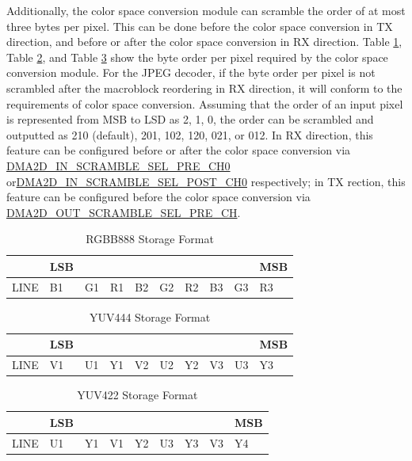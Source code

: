 \documentclass[main\_\_EN.tex]{subfiles}
\begin{document}
Additionally, the color space conversion module can scramble the order of at most three bytes per pixel. This can be done before the color space conversion in TX direction, and before or after the color space conversion in RX direction. Table \ref{tab:rgb888_order}, Table \ref{tab:yuv444_order}, and Table \ref{tab:yuv422_order} show the byte order per pixel required by the color space conversion module. For the JPEG decoder, if the byte order per pixel is not scrambled after the macroblock reordering in RX direction, it will conform to the requirements of color space conversion. Assuming that the order of an input pixel is represented from MSB to LSD as 2, 1, 0, the order can be scrambled and outputted as 210 (default), 201, 102, 120, 021, or 012. In RX direction, this feature can be configured before or after the color space conversion via \hyperref[fielddesc:DMA2DINSCRAMBLESELPRECH0]{DMA2D\_IN\_SCRAMBLE\_SEL\_PRE\_CH0} or\hyperref[fielddesc:DMA2DINSCRAMBLESELPOSTCH0]{DMA2D\_IN\_SCRAMBLE\_SEL\_POST\_CH0} respectively; in TX rection, this feature can be configured before the color space conversion via \hyperref[fielddesc:DMA2DOUTSCRAMBLESELPRECHN]{DMA2D\_OUT\_SCRAMBLE\_SEL\_PRE\_CH}.

\begin{longtable}[c]{|l|l|l|l|l|l|l|l|l|l|}
\caption{RGBB888 Storage Format}
\label{tab:rgb888_order}\\
\hline
          & LSB &    &    &    &    &    &    &    & MSB \\ \hline
    LINE  & B1  & G1 & R1 & B2 & G2 & R2 & B3 & G3 & R3  \\ \hline
\end{longtable}

\begin{longtable}[c]{|l|l|l|l|l|l|l|l|l|l|}
\caption{YUV444 Storage Format}
\label{tab:yuv444_order}\\
\hline
          & LSB &    &    &    &    &    &    &    & MSB \\ \hline
    LINE  & V1  & U1 & Y1 & V2 & U2 & Y2 & V3 & U3 & Y3  \\ \hline
\end{longtable}

\begin{longtable}[c]{|l|l|l|l|l|l|l|l|l|}
\caption{YUV422 Storage Format}
\label{tab:yuv422_order}\\
\hline
          & LSB &    &    &    &    &    &    & MSB \\ \hline
    LINE  & U1  & Y1 & V1 & Y2 & U3 & Y3 & V3 & Y4  \\ \hline
\end{longtable}
\end{document}

